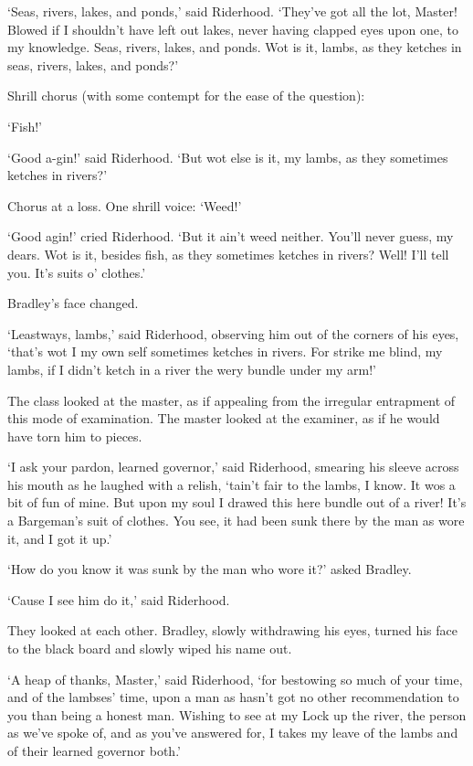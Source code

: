 ‘Seas, rivers, lakes, and ponds,’ said Riderhood. ‘They’ve got all the
lot, Master! Blowed if I shouldn’t have left out lakes, never having
clapped eyes upon one, to my knowledge. Seas, rivers, lakes, and ponds.
Wot is it, lambs, as they ketches in seas, rivers, lakes, and ponds?’

Shrill chorus (with some contempt for the ease of the question):

‘Fish!’

‘Good a-gin!’ said Riderhood. ‘But wot else is it, my lambs, as they
sometimes ketches in rivers?’

Chorus at a loss. One shrill voice: ‘Weed!’

‘Good agin!’ cried Riderhood. ‘But it ain’t weed neither. You’ll never
guess, my dears. Wot is it, besides fish, as they sometimes ketches in
rivers? Well! I’ll tell you. It’s suits o’ clothes.’

Bradley’s face changed.

‘Leastways, lambs,’ said Riderhood, observing him out of the corners
of his eyes, ‘that’s wot I my own self sometimes ketches in rivers. For
strike me blind, my lambs, if I didn’t ketch in a river the wery bundle
under my arm!’

The class looked at the master, as if appealing from the irregular
entrapment of this mode of examination. The master looked at the
examiner, as if he would have torn him to pieces.

‘I ask your pardon, learned governor,’ said Riderhood, smearing his
sleeve across his mouth as he laughed with a relish, ‘tain’t fair to the
lambs, I know. It wos a bit of fun of mine. But upon my soul I drawed
this here bundle out of a river! It’s a Bargeman’s suit of clothes. You
see, it had been sunk there by the man as wore it, and I got it up.’

‘How do you know it was sunk by the man who wore it?’ asked Bradley.

‘Cause I see him do it,’ said Riderhood.

They looked at each other. Bradley, slowly withdrawing his eyes, turned
his face to the black board and slowly wiped his name out.

‘A heap of thanks, Master,’ said Riderhood, ‘for bestowing so much of
your time, and of the lambses’ time, upon a man as hasn’t got no other
recommendation to you than being a honest man. Wishing to see at my Lock
up the river, the person as we’ve spoke of, and as you’ve answered for,
I takes my leave of the lambs and of their learned governor both.’

